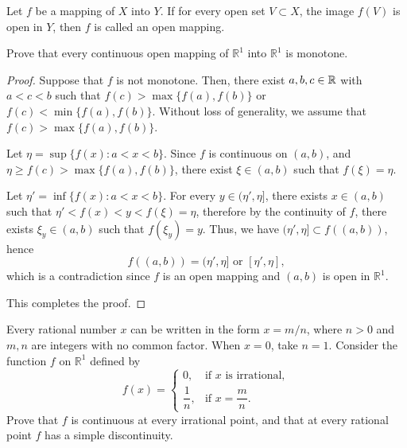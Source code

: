 \documentclass{article}
\begin{document}
\begin{problem}[4-15]
Let $f$ be a mapping of $X$ into $Y$. If for every open set $V\subset X$, the image $f(V)$ is open in $Y$, then $f$ is called an open mapping.

Prove that every continuous open mapping of $\mathbb{R}^1$ into $\mathbb{R}^1$ is monotone.
\end{problem}

\begin{proof}
  Suppose that \( f \) is not monotone. Then, there exist \( a,b,c\in\mathbb{R} \) with \( a<c<b \) such that \( f(c)>\max\{f(a),f(b)\} \) or \( f(c)<\min\{f(a),f(b)\} \). Without loss of generality, we assume that \( f(c)>\max\{f(a),f(b)\} \). \par
  Let \( \eta=\sup\{f(x):a<x<b\} \). Since \( f \) is continuous on \( (a,b) \), and \( \eta\ge f(c)>\max\{f(a),f(b)\} \), there exist \( \xi\in(a,b) \) such that \( f(\xi)=\eta \). \par
  Let \( \eta'=\inf\{f(x):a<x<b\} \). For every \( y\in(\eta',\eta] \), there exists \( x\in(a,b) \) such that \( \eta'<f(x)<y<f(\xi)=\eta \), therefore by the continuity of \( f \), there exists \( \xi_y\in(a,b) \) such that \( f(\xi_y)=y \). Thus, we have \( (\eta',\eta]\subset f((a,b)) \), hence
  \[ f((a,b))=(\eta',\eta]\text{ or }[\eta',\eta], \]
  which is a contradiction since \( f \) is an open mapping and \( (a,b) \) is open in \( \mathbb{R}^1 \).\par
  This completes the proof.
\end{proof}



\begin{problem}[4-18]
Every rational number $x$ can be written in the form $x=m/n$, where $n>0$ and $m,n$ are integers with no common factor. When $x=0$, take $n=1$. Consider the function $f$ on $\mathbb{R}^1$ defined by
\[
f(x)=
\begin{cases}
0, & \text{if } x \text{ is irrational},\\
\dfrac{1}{n}, & \text{if } x=\dfrac{m}{n}.
\end{cases}
\]
Prove that $f$ is continuous at every irrational point, and that at every rational point $f$ has a simple discontinuity.
\end{problem}
\end{document}
